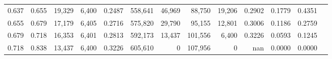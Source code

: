 \begin{tabular}{rrrrrrrrrrrrr}
0.637 & 0.655 & 19,329 & 6,400 &                                     0.2487 & 558,641 &  46,969 &  88,750 &  19,206 & 0.2902 & 0.1779 & 0.4351 \\
0.655 & 0.679 & 17,179 & 6,405 &                                     0.2716 & 575,820 &  29,790 &  95,155 &  12,801 & 0.3006 & 0.1186 & 0.2759 \\
0.679 & 0.718 & 16,353 & 6,401 &                                     0.2813 & 592,173 &  13,437 & 101,556 &   6,400 & 0.3226 & 0.0593 & 0.1245 \\
0.718 & 0.838 & 13,437 & 6,400 &                                     0.3226 & 605,610 &       0 & 107,956 &       0 &    nan & 0.0000 & 0.0000 \\
\bottomrule
\end{tabular}
